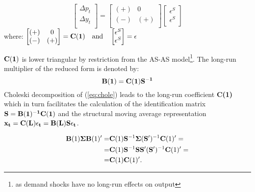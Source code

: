 \begin{equation}
\begin{bmatrix}
\Delta p_t \\
\Delta y_t \\
\end{bmatrix}
=
\begin{bmatrix}
(+) & 0 \\
(-) & (+) \\
\end{bmatrix}
\begin{bmatrix}
\epsilon^S  \\
\epsilon^S \\
\end{bmatrix}
\label{eq:lr}
\end{equation}
where: $
\begin{bmatrix}
(+) & 0 \\
(-) & (+) \\
\end{bmatrix}
=
{\bf C(1)}
\quad
\textrm{and}
\quad
\begin{bmatrix}
\epsilon^S  \\
\epsilon^S \\
\end{bmatrix}
=
{\bf \epsilon}$

${\bf C(1)}$ is lower triangular by restriction from the AS-AS model\footnote{as demand shocks have no long-run effects on output}. The long-run multiplier of the reduced form is denoted by:
\begin{equation}
{\bf B(1)}={\bf C(1)S^{-1}}
\label{eq:lrm}
\end{equation}
Choleski decomposition of (\ref{eq:chole}) leads to the long-run coefficient {\bf C(1)} which in turn facilitates the calculation of the identification matrix ${\bf S}={\bf B(1)^{-1}C(1)}$ and the structural moving average representation ${\bf x_t}={\bf C(L)\epsilon_t}={\bf B(L)S\epsilon_t}$.

\begin{equation}
  \begin{split}
		{\bf B}(1)\boldsymbol{\Sigma}{\bf B}(1)'=&{\bf C}(1){\bf S}^{-1}\boldsymbol{\Sigma}({\bf S}')^{-1}{\bf C}(1)'=\\=&{\bf C}(1){\bf S}^{-1}{\bf S}{\bf S}'({\bf S}')^{-1}{\bf C}(1)^		{\prime}=\\=&{\bf C}(1){\bf C}(1)'.
   \end{split}
\label{eq:chole}			
\end{equation}

\clearpage
%
%
%
%
%
